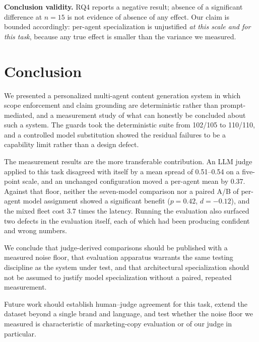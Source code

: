 \documentclass[journal]{IEEEtran}
\begin{document}
\textbf{Conclusion validity.} RQ4 reports a negative result; absence of a
significant difference at $n=15$ is not evidence of absence of any effect. Our
claim is bounded accordingly: per-agent specialization is unjustified
\emph{at this scale and for this task}, because any true effect is smaller than
the variance we measured.

\section{Conclusion}

We presented a personalized multi-agent content generation system in which
scope enforcement and claim grounding are deterministic rather than
prompt-mediated, and a measurement study of what can honestly be concluded
about such a system. The guards took the deterministic suite from 102/105 to
110/110, and a controlled model substitution showed the residual failures to be
a capability limit rather than a design defect.

The measurement results are the more transferable contribution. An LLM judge
applied to this task disagreed with itself by a mean spread of 0.51--0.54 on a
five-point scale, and an unchanged configuration moved a per-agent mean by
0.37. Against that floor, neither the seven-model comparison nor a paired A/B
of per-agent model assignment showed a significant benefit
($p = 0.42$, $d = -0.12$), and the mixed fleet cost 3.7 times the latency.
Running the evaluation also surfaced two defects in the evaluation itself, each
of which had been producing confident and wrong numbers.

We conclude that judge-derived comparisons should be published with a measured
noise floor, that evaluation apparatus warrants the same testing discipline as
the system under test, and that architectural specialization should not be
assumed to justify model specialization without a paired, repeated measurement.

Future work should establish human--judge agreement for this task, extend the
dataset beyond a single brand and language, and test whether the noise floor we
measured is characteristic of marketing-copy evaluation or of our judge in
particular.
\end{document}
